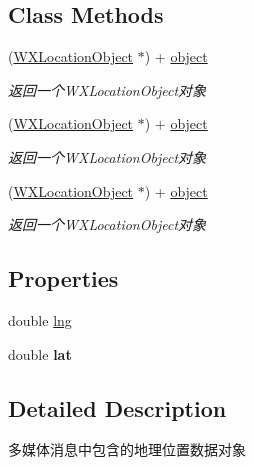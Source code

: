 \subsection*{Class Methods}
\begin{DoxyCompactItemize}
\item 
(\mbox{\hyperlink{interface_w_x_location_object}{W\+X\+Location\+Object}} $\ast$) + \mbox{\hyperlink{interface_w_x_location_object_ad42a7781455ce3515267360bc029e384}{object}}
\begin{DoxyCompactList}\small\item\em 返回一个\+W\+X\+Location\+Object对象 \end{DoxyCompactList}\item 
(\mbox{\hyperlink{interface_w_x_location_object}{W\+X\+Location\+Object}} $\ast$) + \mbox{\hyperlink{interface_w_x_location_object_ad42a7781455ce3515267360bc029e384}{object}}
\begin{DoxyCompactList}\small\item\em 返回一个\+W\+X\+Location\+Object对象 \end{DoxyCompactList}\item 
(\mbox{\hyperlink{interface_w_x_location_object}{W\+X\+Location\+Object}} $\ast$) + \mbox{\hyperlink{interface_w_x_location_object_ad42a7781455ce3515267360bc029e384}{object}}
\begin{DoxyCompactList}\small\item\em 返回一个\+W\+X\+Location\+Object对象 \end{DoxyCompactList}\end{DoxyCompactItemize}
\subsection*{Properties}
\begin{DoxyCompactItemize}
\item 
double \mbox{\hyperlink{interface_w_x_location_object_a84ed947c84f559812941536a126e02f7}{lng}}
\item 
\mbox{\label{interface_w_x_location_object_aec55ba628e60069c1ae73ef2db79cf3d}} 
double {\bfseries lat}
\end{DoxyCompactItemize}


\subsection{Detailed Description}
多媒体消息中包含的地理位置数据对象 

